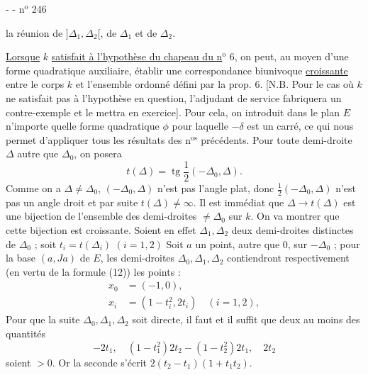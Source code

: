 -  - \hfill n$^{\mathrm{o}}$ 246

la réunion de $]\Delta_1,\Delta_2[$, de $\Delta_1$ et de $\Delta_2$.

\uline{Lorsque} $k$ \uline{satisfait à l'hypothèse du chapeau du n$^{\mathrm{o}}$} 6, on peut, au moyen d'une forme quadratique auxiliaire, établir une correspondance biunivoque \uline{croissante} entre le corps $k$ et l'ensemble ordonné défini par la prop. 6. [N.B. Pour le cas où $k$ ne satisfait pas à l'hypothèse en question, l'adjudant de service fabriquera un contre-exemple et le mettra en exercice]. Pour cela, on introduit dans le plan $E$ n'importe quelle forme quadratique $\phi$ pour laquelle $-\delta$ est un carré, ce qui nous permet d'appliquer tous les résultats des n$^{\mathrm{os}}$ précédents. Pour toute demi-droite $\Delta$ autre que $\Delta_0$, on posera
\[
t(\Delta)=\operatorname{tg}\frac12(-\Delta_0,\Delta).
\]
Comme on a $\Delta\ne\Delta_0$, $(-\Delta_0,\Delta)$ n'est pas l'angle plat, donc $\frac12(-\Delta_0,\Delta)$ n'est pas un angle droit et par suite $t(\Delta)\ne\infty$. Il est immédiat que $\Delta\longrightarrow t(\Delta)$ est une bijection de l'ensemble des demi-droites $\ne\Delta_0$ sur $k$. On va montrer que cette bijection est croissante. Soient en effet $\Delta_1,\Delta_2$ deux demi-droites distinctes de $\Delta_0$ ; soit $t_i=t(\Delta_i)$ $(i=1,2)$
Soit $a$ un point, autre que $0$, sur $-\Delta_0$ ; pour la base $(a,Ja)$ de $E$, les demi-droites $\Delta_0,\Delta_1,\Delta_2$ contiendront respectivement (en vertu de la formule (12)) les points :
\[
\begin{aligned}
x_0&=(-1,0),\\
x_i&=(1-t_i^2,2t_i)\quad(i=1,2),
\end{aligned}
\]
Pour que la suite $\Delta_0,\Delta_1,\Delta_2$ soit directe, il faut et il suffit que deux au moins des quantités
\[
-2t_1,\quad(1-t_1^2)2t_2-(1-t_2^2)2t_1,\quad2t_2
\]
soient $>0$. Or la seconde s'écrit $2(t_2-t_1)(1+t_1t_2)$.
